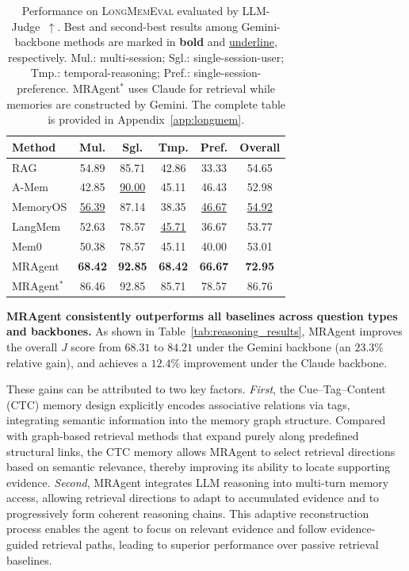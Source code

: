 \documentclass{llmxive}
\begin{document}
\begin{table}[t]
\centering
\small
\setlength{\tabcolsep}{5pt}
\begin{tabular}{lcccc|c}
\toprule
Method & Mul. & Sgl. & Tmp. & Pref. & Overall \\
\midrule
RAG       
& 54.89 
& 85.71 
& 42.86
& 33.33 
& 54.65 \\

A-Mem     
& 42.85 
& \underline{90.00} 
& 45.11  
& 46.43 
& 52.98 \\

MemoryOS 
& \underline{56.39} 
& 87.14 
& 38.35 
& \underline{46.67} 
& \underline{54.92} \\

LangMem  
& 52.63 
& 78.57 
& \underline{45.71} 
& 36.67 
& 53.77 \\

Mem0
& 50.38
& 78.57
& 45.11
& 40.00
& 53.01 \\

MRAgent  
& \textbf{68.42} 
& \textbf{92.85} 
& \textbf{68.42} 
& \textbf{66.67} 
& \textbf{72.95} \\

\midrule
MRAgent$^{*}$  
& 86.46 
& 92.85  
& 85.71 
& 78.57 
& 86.76 \\
\bottomrule
\end{tabular}
\label{tab:longmem}
\caption{Performance on \textsc{LongMemEval} evaluated by LLM-Judge~$\uparrow$.
Best and second-best results among Gemini-backbone methods are marked in
\textbf{bold} and \underline{underline}, respectively.
Mul.: multi-session; Sgl.: single-session-user; Tmp.: temporal-reasoning;
Pref.: single-session-preference.
MRAgent$^{*}$ uses Claude for retrieval while memories are constructed by Gemini.
The complete table is provided in Appendix~\ref{app:longmem}.}
\end{table}




\textbf{MRAgent consistently outperforms all baselines across question types and backbones.}
As shown in Table~\ref{tab:reasoning_results}, MRAgent improves the overall $J$ score from $68.31$ to $84.21$ under the Gemini backbone (an $23.3\%$ relative gain), and achieves a $12.4\%$ improvement under the Claude backbone.

These gains can be attributed to two key factors.
\textit{First}, the Cue–Tag–Content (CTC) memory design explicitly encodes
associative relations via tags, integrating semantic information into the
memory graph structure.
Compared with graph-based retrieval methods that expand purely along predefined
structural links, the CTC memory allows MRAgent to select retrieval directions
based on semantic relevance, thereby improving its ability to locate supporting
evidence.
\textit{Second}, MRAgent integrates LLM reasoning into multi-turn memory access,
allowing retrieval directions to adapt to accumulated evidence and to
progressively form coherent reasoning chains.
This adaptive reconstruction process enables the agent to focus on relevant
evidence and follow evidence-guided retrieval paths, leading to
superior performance over passive retrieval baselines.
\end{document}
